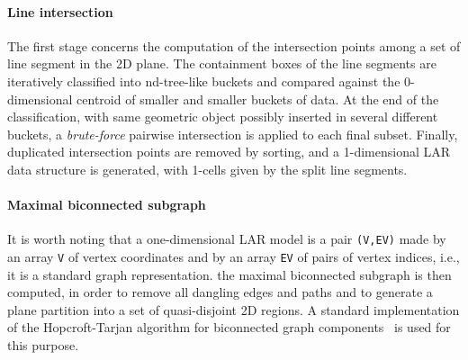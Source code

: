 \documentclass[]{egpubl}
\begin{document}
\paragraph*{Line intersection}\label{intersection-of-lines-and-graph-generation}
The first stage concerns the computation of the
intersection points among a set of line segment in the 2D plane. The
containment boxes of the line segments are iteratively classified into nd-tree-like buckets and compared against the 0-dimensional centroid of smaller and smaller buckets of
data.
At the end of the classification, with same geometric object possibly
inserted in several different buckets, a \emph{brute-force} pairwise intersection
is applied to each final subset. Finally, duplicated intersection
points are removed by sorting, and a 1-dimensional LAR data structure is generated,
with 1-cells given by the split line segments.

\paragraph*{Maximal biconnected
subgraph}\label{computation-of-the-maximal-biconnected-subgraph}
It is worth noting that a one-dimensional LAR model is a pair \texttt{(V,EV)} made by an array \texttt{V} of vertex coordinates and by an array \texttt{EV} of pairs of vertex indices, i.e., it is a standard graph representation. the maximal biconnected subgraph is then computed, in order to remove all dangling edges and paths and to generate a plane partition into a set of quasi-disjoint 2D regions. A standard implementation of the Hopcroft-Tarjan algorithm for biconnected graph components~\cite{Hopcroft:1973:AEA:362248.362272} is used for this purpose.
\end{document}
